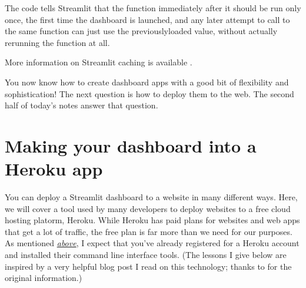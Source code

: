 \documentclass[letterpaper,10pt,english]{sphinxmanual}
\begin{document}
\begin{sphinxVerbatim}[commandchars=\\\{\}]
  
       

  
\end{sphinxVerbatim}

The  code tells Streamlit that the function immediately after it should be run only once, the first time the dashboard is launched, and any later attempt to call to the same function can just use the previously\sphinxhyphen{}loaded value, without actually re\sphinxhyphen{}running the function at all.

More information on Streamlit caching is available .

You now know how to create dashboard apps with a good bit of flexibility and sophistication!  The next question is how to deploy them to the web.  The second half of today’s notes answer that question.


\section{Making your dashboard into a Heroku app}
\label{\detokenize{chapter-14-dashboards:making-your-dashboard-into-a-heroku-app}}
You can deploy a Streamlit dashboard to a website in many different ways.  Here, we will cover a tool used by many developers to deploy websites to a free cloud hosting platorm, Heroku.  While Heroku has paid plans for websites and web apps that get a lot of traffic, the free plan is far more than we need for our purposes.  As mentioned {\hyperref[\detokenize{chapter-14-dashboards:whats-a-dashboard-and-why-do-we-have-them}]{\emph{above}}}, I expect that you’ve already registered for a Heroku account and installed their command line interface tools.  (The lessons I give below are inspired by a very helpful blog post I read on this technology; thanks to  for the original information.)
\end{document}
